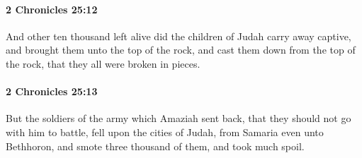 		\paragraph{2 Chronicles 25:12} %
			\label{2CHRONICLES-25-12}

			And other ten thousand left alive did the children of Judah carry away captive, and brought them unto the top of the rock, and cast them down from the top of the rock, that they all were broken in pieces.


		\paragraph{2 Chronicles 25:13} %
			\label{2CHRONICLES-25-13}

			But the soldiers of the army which Amaziah sent back, that they should not go with him to battle, fell upon the cities of Judah, from Samaria even unto Bethhoron, and smote three thousand of them, and took much spoil.

